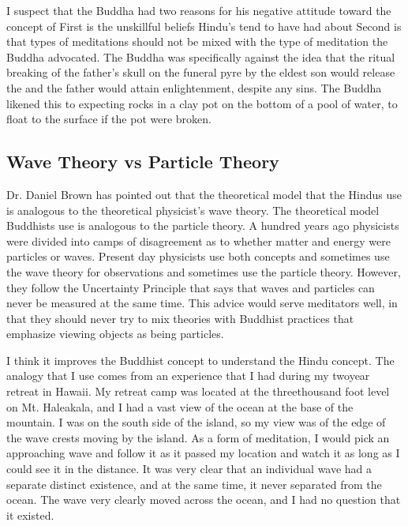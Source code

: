 \documentclass[a5paper,10pt,english]{book}
\begin{document}
\sphinxAtStartPar
I suspect that the Buddha had two reasons for his negative attitude
toward the concept of  First is the unskillful beliefs
Hindu’s tend to have had about  Second is that  types
of meditations should not be mixed with the  type of
meditation the Buddha advocated. The Buddha was specifically against the
idea that the ritual breaking of the father’s skull on the funeral pyre
by the eldest son would release the  and the father would attain
enlightenment, despite any sins. The Buddha likened this to expecting
rocks in a clay pot on the bottom of a pool of water, to float to the
surface if the pot were broken.


\subsection{Wave Theory vs Particle Theory}
\label{\detokenize{saints:wave-theory-vs-particle-theory}}
\sphinxAtStartPar
Dr. Daniel Brown has pointed out that the theoretical model that the
Hindus use is analogous to the theoretical physicist’s wave theory. The
theoretical model Buddhists use is analogous to the particle theory. A
hundred years ago physicists were divided into camps of disagreement as
to whether matter and energy were particles or waves. Present day
physicists use both concepts and sometimes use the wave theory for
observations and sometimes use the particle theory. However, they follow
the Uncertainty Principle that says that waves and particles can never
be measured at the same time. This advice would serve meditators well,
in that they should never try to mix  theories with Buddhist
practices that emphasize viewing objects as being particles.

\sphinxAtStartPar
I think it improves the Buddhist concept to understand the Hindu concept.
The analogy that I use comes from an experience that I had during my
two\sphinxhyphen{}year retreat in Hawaii. My retreat camp was located at the
three\sphinxhyphen{}thousand foot level on Mt. Haleakala, and I had a vast view of the
ocean at the base of the mountain. I was on the south side of the
island, so my view was of the edge of the wave crests moving by the
island. As a form of meditation, I would pick an approaching wave and
follow it as it passed my location and watch it as long as I could see
it in the distance. It was very clear that an individual wave had a
separate distinct existence, and at the same time, it never separated
from the ocean. The wave very clearly moved across the ocean, and I had
no question that it existed.
\end{document}
